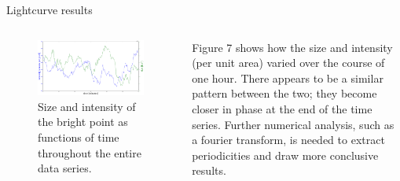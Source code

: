 \documentclass[t]{beamer}
\begin{document}
\begin{frame}[t]
\begin{block}{}
\begin{columns}
        \begin{block}{Lightcurve results}
            \begin{columns}
                \begin{figure}
                    \includegraphics[width=\textwidth]{../plot2.png}
                    \caption{Size and intensity of the
                        bright point as functions of time throughout the entire
                        data series.}
                \end{figure}
                \vspace*{\fill}
                \clearpage
                \textcolor{myred}{Figure 7} shows how the size and intensity
                (per unit area) varied over the course of one hour.
                There appears to be a similar pattern between the two;
                they become closer in phase at the end of the time series.
                Further numerical analysis, such as a fourier transform,
                is needed to extract periodicities and draw more
                conclusive results.
                \vfill
                \clearpage
            \end{columns}
        \end{block}


\end{columns}
\end{block}
\end{frame}
\end{document}

